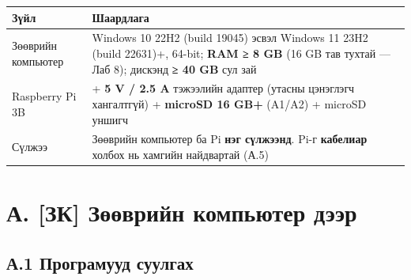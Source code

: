 \begingroup\scriptsize\begin{longtable}[]{@{}ll@{}}
\toprule
\begin{minipage}[b]{0.47\columnwidth}\raggedright
Зүйл\strut
\end{minipage} & \begin{minipage}[b]{0.47\columnwidth}\raggedright
Шаардлага\strut
\end{minipage}\tabularnewline
\midrule
\endhead
\begin{minipage}[t]{0.47\columnwidth}\raggedright
Зөөврийн компьютер\strut
\end{minipage} & \begin{minipage}[t]{0.47\columnwidth}\raggedright
Windows 10 22H2 (build 19045) эсвэл Windows 11 23H2 (build 22631)+, 64-bit; \textbf{RAM ≥ 8 GB} (16 GB тав тухтай --- Лаб 8); дискэнд \textbf{≥ 40 GB} сул зай\strut
\end{minipage}\tabularnewline
\begin{minipage}[t]{0.47\columnwidth}\raggedright
Raspberry Pi 3B\strut
\end{minipage} & \begin{minipage}[t]{0.47\columnwidth}\raggedright
+ \textbf{5 V / 2.5 A} тэжээлийн адаптер (утасны цэнэглэгч хангалтгүй) + \textbf{microSD 16 GB+} (A1/A2) + microSD уншигч\strut
\end{minipage}\tabularnewline
\begin{minipage}[t]{0.47\columnwidth}\raggedright
Сүлжээ\strut
\end{minipage} & \begin{minipage}[t]{0.47\columnwidth}\raggedright
Зөөврийн компьютер ба Pi \textbf{нэг сүлжээнд}. Pi-г \textbf{кабелиар} холбох нь хамгийн найдвартай (А.5)\strut
\end{minipage}\tabularnewline
\bottomrule
\end{longtable}\endgroup

\hypertarget{ux430.-ux437ux43a-ux437ux4e9ux4e9ux432ux440ux438ux439ux43d-ux43aux43eux43cux43fux44cux44eux442ux435ux440-ux434ux44dux44dux440}{%
\section{А. {[}ЗК{]} Зөөврийн компьютер дээр}\label{ux430.-ux437ux43a-ux437ux4e9ux4e9ux432ux440ux438ux439ux43d-ux43aux43eux43cux43fux44cux44eux442ux435ux440-ux434ux44dux44dux440}}

\hypertarget{ux430.1-ux43fux440ux43eux433ux440ux430ux43cux443ux443ux434-ux441ux443ux443ux43bux433ux430ux445}{%
\subsection{А.1 Програмууд суулгах}\label{ux430.1-ux43fux440ux43eux433ux440ux430ux43cux443ux443ux434-ux441ux443ux443ux43bux433ux430ux445}}


